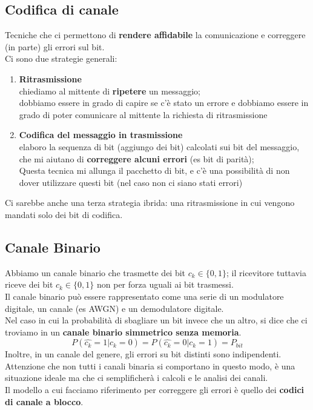 \documentclass{article}
\begin{document}
\subsection{Codifica di canale}
Tecniche che ci permettono di \textbf{rendere affidabile} la comunicazione e correggere (in parte) gli errori sul bit.\\
Ci sono due strategie generali:
\begin{enumerate}
	\item \textbf{Ritrasmissione}\\
	chiediamo al mittente di \textbf{ripetere} un messaggio;\\
	dobbiamo essere in grado di capire se c'è stato un errore e dobbiamo essere in grado di poter comunicare al mittente la richiesta di ritrasmissione
	\item \textbf{Codifica del messaggio in trasmissione}\\
	elaboro la sequenza di bit (aggiungo dei bit) calcolati sui bit del messaggio, che mi aiutano di \textbf{correggere alcuni errori} (es bit di parità);\\
	Questa tecnica mi allunga il pacchetto di bit, e c'è una possibilità di non dover utilizzare questi bit (nel caso non ci siano stati errori)
\end{enumerate}
Ci sarebbe anche una terza strategia ibrida: una ritrasmissione in cui vengono mandati solo dei bit di codifica.

\subsection{Canale Binario}
Abbiamo un canale binario che trasmette dei bit $c_k\in\{0,1\}$; il ricevitore tuttavia riceve dei bit $\hat{c_k}\in\{0,1\}$ non per forza uguali ai bit trasmessi.\\
Il canale binario può essere rappresentato come una serie di un modulatore digitale, un canale (es AWGN) e un demodulatore digitale.\\
Nel caso in cui la probabilità di sbagliare un bit invece che un altro, si dice che ci troviamo in un \textbf{canale binario simmetrico senza memoria}.
$$P(\hat{c_k}=1|c_k=0)=P(\hat{c_k}=0|c_k=1)=P_{bit}$$
Inoltre, in un canale del genere, gli errori su bit distinti sono indipendenti.\\
Attenzione che non tutti i canali binaria si comportano in questo modo, è una situazione ideale ma che ci semplificherà i calcoli e le analisi dei canali.\\
Il modello a cui facciamo riferimento per correggere gli errori è quello dei \textbf{codici di canale a blocco}.
\end{document}
